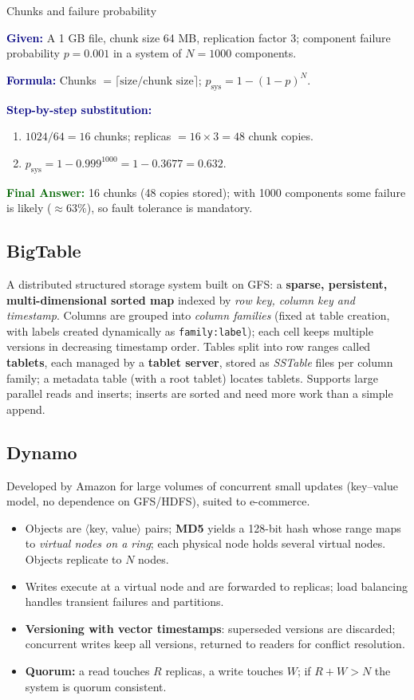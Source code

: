 \documentclass[11pt,a4paper,openany]{report}
\newcommand{\Given}{\par\textbf{\textcolor{navy}{Given:}} }
\newcommand{\Formula}{\par\textbf{\textcolor{navy}{Formula:}} }
\newcommand{\Steps}{\par\textbf{\textcolor{navy}{Step-by-step substitution:}}\par}
\newcommand{\Answer}{\par\textbf{\textcolor{darkgreen}{Final Answer:}} }
\begin{document}
\begin{solved}{Chunks and failure probability}
\Given A 1 GB file, chunk size 64 MB, replication factor 3; component failure probability $p = 0.001$ in a system of $N = 1000$ components.
\Formula Chunks $= \lceil \text{size}/\text{chunk size} \rceil$; $p_{\text{sys}} = 1 - (1-p)^N$.
\Steps
\begin{enumerate}[leftmargin=*]
  \item $1024/64 = 16$ chunks; replicas $= 16 \times 3 = 48$ chunk copies.
  \item $p_{\text{sys}} = 1 - 0.999^{1000} = 1 - 0.3677 = 0.632$.
\end{enumerate}
\Answer 16 chunks (48 copies stored); with 1000 components some failure is likely ($\approx 63\%$), so fault tolerance is mandatory.
\end{solved}

\subsection{BigTable}
A distributed structured storage system built on GFS: a \textbf{sparse, persistent, multi-dimensional sorted map} indexed by
\emph{row key, column key and timestamp}. Columns are grouped into \emph{column families} (fixed at table creation, with labels
created dynamically as \texttt{family:label}); each cell keeps multiple versions in decreasing timestamp order. Tables split into
row ranges called \textbf{tablets}, each managed by a \textbf{tablet server}, stored as \emph{SSTable} files per column family; a
metadata table (with a root tablet) locates tablets. Supports large parallel reads and inserts; inserts are sorted and need more
work than a simple append.

\subsection{Dynamo}
Developed by Amazon for large volumes of concurrent small updates (key--value model, no dependence on GFS/HDFS), suited to
e-commerce.
\begin{itemize}[leftmargin=*]
  \item Objects are $\langle$key, value$\rangle$ pairs; \textbf{MD5} yields a 128-bit hash whose range maps to \emph{virtual nodes
        on a ring}; each physical node holds several virtual nodes. Objects replicate to $N$ nodes.
  \item Writes execute at a virtual node and are forwarded to replicas; load balancing handles transient failures and partitions.
  \item \textbf{Versioning with vector timestamps}: superseded versions are discarded; concurrent writes keep all versions, returned
        to readers for conflict resolution.
  \item \textbf{Quorum:} a read touches $R$ replicas, a write touches $W$; if $R + W > N$ the system is quorum consistent.
\end{itemize}
\end{document}

